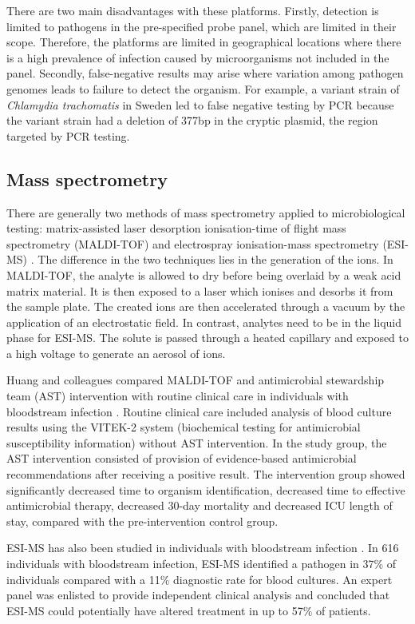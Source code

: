 There are two main disadvantages with these platforms. Firstly, detection is limited to pathogens in the pre-specified probe panel, which are limited in their scope. Therefore, the platforms are limited in geographical locations where there is a high prevalence of infection caused by microorganisms not included in the panel. Secondly, false-negative results may arise where variation among pathogen genomes leads to failure to detect the organism. For example, a variant strain of \textit{Chlamydia trachomatis} in Sweden led to false negative testing by PCR \parencite{Ripa2006} because the variant strain had a deletion of 377bp in the cryptic plasmid, the region targeted by PCR testing.

\subsection{Mass spectrometry}
There are generally two methods of mass spectrometry applied to microbiological testing: matrix-assisted laser desorption ionisation-time of flight mass spectrometry (MALDI-TOF) and electrospray ionisation-mass spectrometry (ESI-MS) \parencite{Buchan2014}. The difference in the two techniques lies in the generation of the ions. In MALDI-TOF, the analyte is allowed to dry before being overlaid by a weak acid matrix material. It is then exposed to a laser which ionises and desorbs it from the sample plate. The created ions are then accelerated through a vacuum by the application of an electrostatic field. In contrast, analytes need to be in the liquid phase for ESI-MS. The solute is passed through a heated capillary and exposed to a high voltage to generate an aerosol of ions. 

Huang and colleagues compared MALDI-TOF and antimicrobial stewardship team (AST) intervention with routine clinical care in individuals with bloodstream infection \parencite{Huang2013}. Routine clinical care included analysis of blood culture results using the VITEK-2 system (biochemical testing for antimicrobial susceptibility information) without AST intervention. In the study group, the AST intervention consisted of provision of evidence-based antimicrobial recommendations after receiving a positive result. The intervention group showed significantly decreased time to organism identification, decreased time to effective antimicrobial therapy, decreased 30-day mortality and decreased ICU length of stay, compared with the pre-intervention control group.

ESI-MS has also been studied in individuals with bloodstream infection \parencite{Vincent2015}. In 616 individuals with bloodstream infection, ESI-MS identified a pathogen in 37\% of individuals compared with a 11\% diagnostic rate for blood cultures. An expert panel was enlisted to provide independent clinical analysis and concluded that ESI-MS could potentially have altered treatment in up to 57\% of patients.

